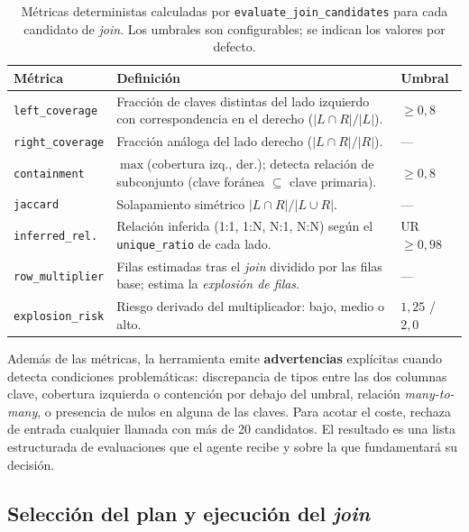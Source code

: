 \begin{table}[H]
\centering
\caption{Métricas deterministas calculadas por \texttt{evaluate\_join\_candidates} para
cada candidato de \textit{join}. Los umbrales son configurables; se indican los valores
por defecto.}
\label{tab:join-metricas}
\small
\setlength{\tabcolsep}{5pt}
\begin{tabular}{lp{6.2cm}l}
\toprule
\textbf{Métrica} & \textbf{Definición} & \textbf{Umbral} \\
\midrule
\texttt{left\_coverage}  & Fracción de claves distintas del lado izquierdo con
                           correspondencia en el derecho ($|L\cap R| / |L|$). & $\geq 0{,}8$ \\
\texttt{right\_coverage} & Fracción análoga del lado derecho ($|L\cap R| / |R|$). & --- \\
\texttt{containment}     & $\max$(cobertura izq., der.); detecta relación de subconjunto
                           (clave foránea $\subseteq$ clave primaria). & $\geq 0{,}8$ \\
\texttt{jaccard}         & Solapamiento simétrico $|L\cap R| / |L\cup R|$. & --- \\
\texttt{inferred\_rel.}  & Relación inferida (1:1, 1:N, N:1, N:N) según el
                           \texttt{unique\_ratio} de cada lado. & UR $\geq 0{,}98$ \\
\texttt{row\_multiplier} & Filas estimadas tras el \textit{join} dividido por las filas
                           base; estima la \emph{explosión de filas}. & --- \\
\texttt{explosion\_risk} & Riesgo derivado del multiplicador: bajo, medio o alto. &
                           $1{,}25$ / $2{,}0$ \\
\bottomrule
\end{tabular}
\end{table}

Además de las métricas, la herramienta emite \textbf{advertencias} explícitas cuando
detecta condiciones problemáticas: discrepancia de tipos entre las dos columnas clave,
cobertura izquierda o contención por debajo del umbral, relación \textit{many-to-many}, o
presencia de nulos en alguna de las claves. Para acotar el coste, rechaza de entrada
cualquier llamada con más de 20 candidatos. El resultado es una lista estructurada de
evaluaciones que el agente recibe y sobre la que fundamentará su decisión.

\subsection{Selección del plan y ejecución del \textit{join}}
\label{sec:join-ejecucion}

